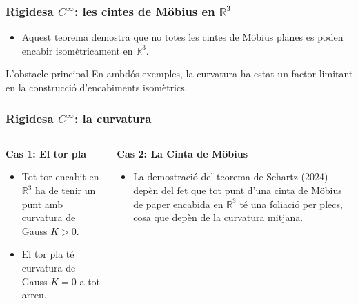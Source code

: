 \documentclass[aspectratio=169]{beamer}
\begin{document}
  \begin{frame}
    \frametitle{Rigidesa $C^\infty$: les cintes de Möbius  en $\mathbb{R}^3$}
      \begin{itemize}
        \begin{block}{Teorema (Schartz, 2024)}
            Qualsevol cinta de Möbius de paper encabida en $\mathbb R^3$ té raó d'aspecte $\lambda > \sqrt{3}$.
        \end{block}
          \item<1-> Aquest teorema demostra que no totes les cintes de Möbius planes es poden encabir isomètricament en $\mathbb R^3$.
      \end{itemize}
  \end{frame}
\begin{frame}
    \begin{alertblock}{L'obstacle principal}
        En ambdós exemples, la curvatura ha estat un factor limitant en la construcció d'encabiments isomètrics.
    \end{alertblock}
  \frametitle{Rigidesa $C^\infty$: la curvatura}
  
  \begin{columns}[T]
    \begin{column}{0.5\textwidth}
      \textbf{Cas 1: El tor pla}
      \begin{itemize}
        \item Tot tor encabit en $\mathbb R^3$ ha de tenir un punt amb curvatura de Gauss $K > 0$.
        \item El tor pla té curvatura de Gauss $K = 0$ a tot arreu.
      \end{itemize}
    \end{column}
    \begin{column}{0.5\textwidth}
      \textbf{Cas 2: La Cinta de Möbius}
      \begin{itemize}
        \item La demostració del teorema de Schartz (2024) depèn del fet que tot punt d'una cinta de Möbius de paper encabida en $\mathbb R^3$ té una foliació per plecs, cosa que depèn de la curvatura mitjana.
      \end{itemize}
    \end{column}
  \end{columns}
\end{frame}
\end{document}
